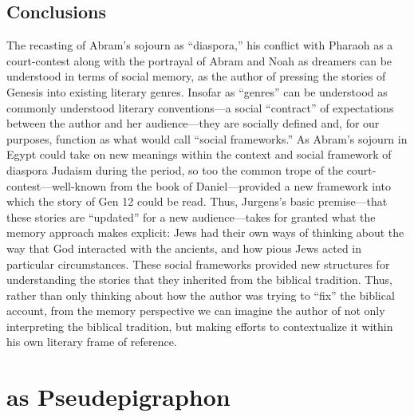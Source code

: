 

\subsection{Conclusions}

The recasting of Abram's sojourn as ``diaspora,'' his conflict with Pharaoh as a court-contest along with the portrayal of Abram and Noah as dreamers can be understood in terms of social memory, as the author of \ga pressing the stories of Genesis into existing literary genres. Insofar as ``genres'' can be understood as commonly understood literary conventions---a social ``contract'' of expectations between the author and her audience---they are socially defined and, for our purposes, function as what \halbwachs would call ``social frameworks.'' As Abram's sojourn in Egypt could take on new meanings within the context and social framework of diaspora Judaism during the \secondtemple period, so too the common trope of the court-contest---well-known from the book of Daniel---provided a new framework into which the story of Gen 12 could be read. Thus, Jurgens's basic premise---that these stories are ``updated'' for a new audience---takes for granted what the memory approach makes explicit: \secondtemple Jews had their own ways of thinking about the way that God interacted with the ancients, and how pious Jews acted in particular circumstances. These social frameworks provided new structures for understanding the stories that they inherited from the biblical tradition. Thus, rather than only thinking about how the author was trying to ``fix'' the biblical account, from the memory perspective we can imagine the author of \ga not only interpreting the biblical tradition, but making efforts to contextualize it within his own literary frame of reference.

\section{\ga as Pseudepigraphon}

